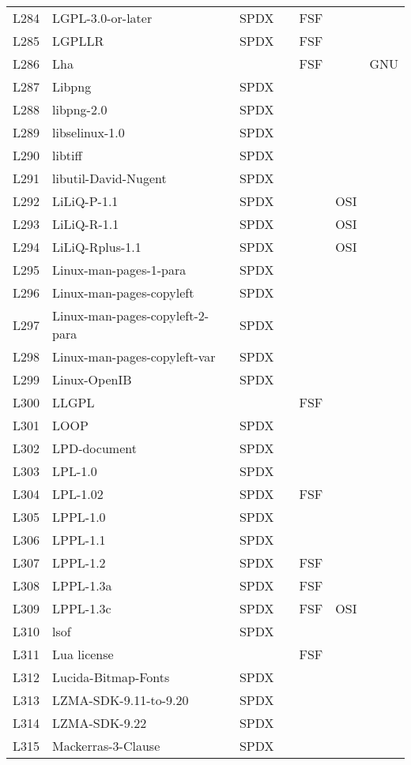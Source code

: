 \begin{longtable}[h]{m{2cm} | m{7cm} | c | c | c | c | c}
L284 & LGPL-3.0-or-later & SPDX &  & FSF &  &  \\
L285 & LGPLLR & SPDX &  & FSF &  &  \\
L286 & Lha &  &  & FSF &  & GNU \\
L287 & Libpng & SPDX &  &  &  &  \\
L288 & libpng-2.0 & SPDX &  &  &  &  \\
L289 & libselinux-1.0 & SPDX &  &  &  &  \\
L290 & libtiff & SPDX &  &  &  &  \\
L291 & libutil-David-Nugent & SPDX &  &  &  &  \\
L292 & LiLiQ-P-1.1 & SPDX &  &  & OSI &  \\
L293 & LiLiQ-R-1.1 & SPDX &  &  & OSI &  \\
L294 & LiLiQ-Rplus-1.1 & SPDX &  &  & OSI &  \\
L295 & Linux-man-pages-1-para & SPDX &  &  &  &  \\
L296 & Linux-man-pages-copyleft & SPDX &  &  &  &  \\
L297 & Linux-man-pages-copyleft-2-para & SPDX &  &  &  &  \\
L298 & Linux-man-pages-copyleft-var & SPDX &  &  &  &  \\
L299 & Linux-OpenIB & SPDX &  &  &  &  \\
L300 & LLGPL &  &  & FSF &  &  \\
L301 & LOOP & SPDX &  &  &  &  \\
L302 & LPD-document & SPDX &  &  &  &  \\
L303 & LPL-1.0 & SPDX &  &  &  &  \\
L304 & LPL-1.02 & SPDX &  & FSF &  &  \\
L305 & LPPL-1.0 & SPDX &  &  &  &  \\
L306 & LPPL-1.1 & SPDX &  &  &  &  \\
L307 & LPPL-1.2 & SPDX &  & FSF &  &  \\
L308 & LPPL-1.3a & SPDX &  & FSF &  &  \\
L309 & LPPL-1.3c & SPDX &  & FSF & OSI &  \\
L310 & lsof & SPDX &  &  &  &  \\
L311 & Lua license &  &  & FSF &  &  \\
L312 & Lucida-Bitmap-Fonts & SPDX &  &  &  &  \\
L313 & LZMA-SDK-9.11-to-9.20 & SPDX &  &  &  &  \\
L314 & LZMA-SDK-9.22 & SPDX &  &  &  &  \\
L315 & Mackerras-3-Clause & SPDX &  &  &  &  \\

\end{longtable}
